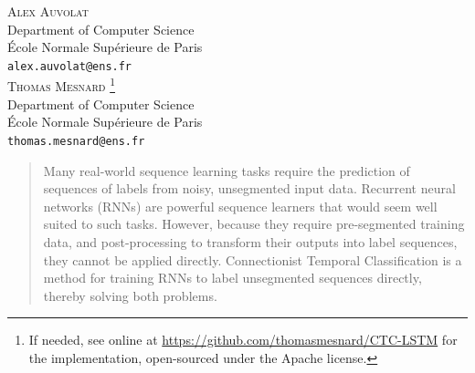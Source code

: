 \documentclass[11pt,a4paper]{article}
\providecommand*{\hr}[1][class-arg]{%
    \hspace*{\fill}\hrulefill\hspace*{\fill}
    \vskip 0.65\baselineskip
}
\begin{document}
\maketitle
\begin{center}
    \begin{multicols}{2}
        \setcounter{footnote}{-1}  %
        \textsc{Alex Auvolat} \\
            Department of Computer Science\\
            \'Ecole Normale Sup\'erieure de Paris \\
            \texttt{alex.auvolat@ens.fr}\\
        \textsc{Thomas Mesnard}
            \footnote{If needed, see online at \url{https://github.com/thomasmesnard/CTC-LSTM} for the implementation, open-sourced under the Apache license.}\\
            Department of Computer Science\\
            \'Ecole Normale Sup\'erieure de Paris \\
            \texttt{thomas.mesnard@ens.fr}\\
    \end{multicols}
\end{center}

\vspace{1em}

\hr{}  %

\vspace{1em}

\begin{abstract}
    Many real-world sequence learning tasks require the prediction of sequences of
    labels from noisy, unsegmented input data. Recurrent neural networks (RNNs) are powerful sequence learners that would seem well suited to such tasks. However, because they require pre-segmented training data, and post-processing to transform their outputs into label sequences, they cannot be applied directly. Connectionist Temporal Classification is a method for training RNNs to label unsegmented sequences directly, thereby solving both problems.
\end{abstract}
\end{document}
